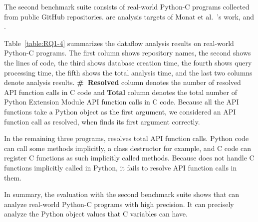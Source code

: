 

The second benchmark suite consists of  real-world Python-C programs
collected from public GitHub repositories.  are analysis
targets of Monat et al.~\cite{sas2021}'s work, and .

Table~\ref{table:RQ1-4} summarizes the dataflow analysis results on 
real-world Python-C programs. 
The first column shows repository names, the second shows the lines of code,
the third shows database creation time,
the fourth shows query processing time, the fifth shows the total analysis time,
and the last two columns denote analysis results.
{\bf \#~Resolved} column denotes the number of resolved API function calls in C code and
{\bf Total} column denotes the total number of Python Extension Module API function
calls in C code. 
Because all the API functions take a Python object as the first argument, we
considered an API function call as resolved, when \ours finds its first argument
correctly. 

%
In the remaining three programs, \ours resolves  total
API function calls. 
Python code can call some methods implicitly, a class destructor for example, and C
code can register C functions as such implicitly called methods.
Because \ours does not handle C functions implicitly called in Python, it
fails to resolve API function calls in them.

In summary, the evaluation with the second benchmark suite shows that
\ours can analyze real-world Python-C programs with high precision.
It can precisely analyze the Python object values that C variables can have.

